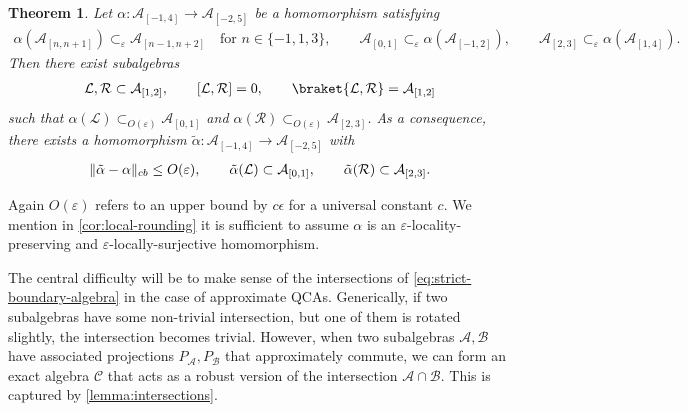 \documentclass[11pt,reqno]{amsart}
\newtheorem{theorem}{Theorem}[section]
\theoremstyle{definition}
\theoremstyle{remark}
\numberwithin{equation}{section}
\newcommand{\eps}{\varepsilon}
\newcommand{\cA}{\mathcal A}
\newcommand{\cB}{\mathcal B}
\newcommand{\cC}{\mathcal C}
\newcommand{\cL}{\mathcal L}
\newcommand{\cR}{\mathcal R}
\DeclarePairedDelimiter\norm{\lVert}{\rVert}
\begin{document}
\begin{theorem}\label{thm:local-rounding}
Let $\alpha : \cA_{[-1,4]} \to \cA_{[-2,5]}$ be a homomorphism satisfying
\begin{align*}
    \alpha(\cA_{[n,n+1]}) \subset_\eps \cA_{[n-1,n+2]} \quad\text{for } n\in \{-1,1,3\}, \qquad
    \cA_{[0,1]} \subset_\eps \alpha(\cA_{[-1,2]}), \qquad
    \cA_{[2,3]} \subset_\eps \alpha(\cA_{[1,4]}).
\end{align*}
Then there exist subalgebras
\begin{align*}
    \cL, \cR \subset \cA_{[1,2]}, \qquad [\cL,\cR]=0, \qquad \braket{\cL, \cR} = \cA_{[1,2]}
\end{align*}
such that $\alpha(\cL) \subset_{O(\eps)} \cA_{[0,1]}$ and $\alpha(\cR) \subset_{O(\eps)} \cA_{[2,3]}$.
As a consequence, there exists a homomorphism $\tilde{\alpha} : \cA_{[-1,4]} \to \cA_{[-2,5]}$ with
\begin{align*}
    \norm{\tilde\alpha - \alpha}_{cb} \leq O(\eps), \qquad
    \tilde \alpha(\cL) \subset \cA_{[0,1]}, \qquad
    \tilde \alpha(\cR) \subset \cA_{[2,3]}.
\end{align*}
\end{theorem}
\noindent
Again $O(\eps)$ refers to an upper bound by $c\epsilon$ for a universal constant $c$. We mention in \cref{cor:local-rounding} it is sufficient to assume $\alpha$ is an $\eps$-locality-preserving and $\eps$-locally-surjective homomorphism.

The central difficulty will be to make sense of the intersections of \cref{eq:strict-boundary-algebra} in the case of approximate QCAs.  Generically, if two subalgebras have some non-trivial intersection, but one of them is rotated slightly, the intersection becomes trivial. However, when two subalgebras $\cA, \cB$ have associated projections $P_\cA, P_\cB$ that approximately commute, we can form an exact algebra $\cC$ that acts as a robust version of the intersection $\cA \cap \cB$.
This is captured by \cref{lemma:intersections}.


\end{document}
